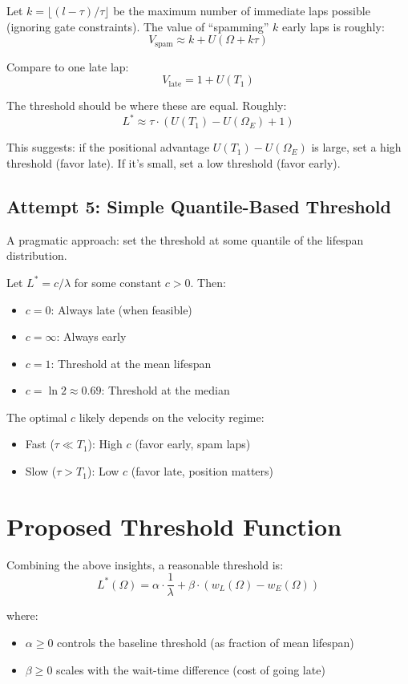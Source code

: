 \documentclass{article}
\begin{document}
Let $k = \lfloor (l - \tau) / \tau \rfloor$ be the maximum number of immediate laps possible (ignoring gate constraints). The value of ``spamming'' $k$ early laps is roughly:
\[
V_{\text{spam}} \approx k + U(\Omega + k\tau)
\]

Compare to one late lap:
\[
V_{\text{late}} = 1 + U(T_1)
\]

The threshold should be where these are equal. Roughly:
\[
L^* \approx \tau \cdot \left( U(T_1) - U(\Omega_E) + 1 \right)
\]

This suggests: if the positional advantage $U(T_1) - U(\Omega_E)$ is large, set a high threshold (favor late). If it's small, set a low threshold (favor early).

\subsection{Attempt 5: Simple Quantile-Based Threshold}

A pragmatic approach: set the threshold at some quantile of the lifespan distribution.

Let $L^* = c / \lambda$ for some constant $c > 0$. Then:
\begin{itemize}
    \item $c = 0$: Always late (when feasible)
    \item $c = \infty$: Always early
    \item $c = 1$: Threshold at the mean lifespan
    \item $c = \ln 2 \approx 0.69$: Threshold at the median
\end{itemize}

The optimal $c$ likely depends on the velocity regime:
\begin{itemize}
    \item Fast ($\tau \ll T_1$): High $c$ (favor early, spam laps)
    \item Slow ($\tau > T_1$): Low $c$ (favor late, position matters)
\end{itemize}

\section{Proposed Threshold Function}

Combining the above insights, a reasonable threshold is:
\[
L^*(\Omega) = \alpha \cdot \frac{1}{\lambda} + \beta \cdot (w_L(\Omega) - w_E(\Omega))
\]

where:
\begin{itemize}
    \item $\alpha \geq 0$ controls the baseline threshold (as fraction of mean lifespan)
    \item $\beta \geq 0$ scales with the wait-time difference (cost of going late)
\end{itemize}
\end{document}
